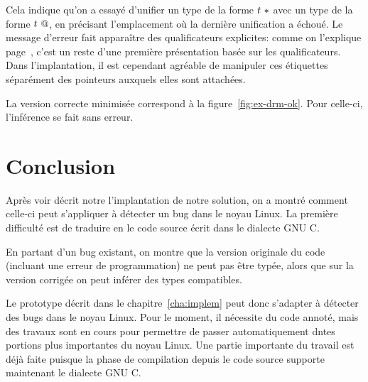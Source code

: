 Cela indique qu'on a essayé d'unifier un type de la forme $t~*$ avec un
type de la forme $t~@$, en précisant l'emplacement où la dernière
unification a échoué. Le message d'erreur fait apparaître des qualificateurs
explicites: comme on l'explique page~\pageref{page:qualifs-pas-qualifs}, c'est
un reste d'une première présentation basée sur les qualificateurs.
Dans l'implantation, il est cependant agréable de manipuler ces étiquettes
séparément des pointeurs auxquels elles sont attachées.

La version correcte minimisée correspond à la figure~\ref{fig:ex-drm-ok}. Pour
celle-ci, l'inférence se fait sans erreur.


\section*{Conclusion}

Après voir décrit notre l'implantation de notre solution, on a montré comment
celle-ci peut s'appliquer à détecter un bug dans le noyau Linux. La première
difficulté est de traduire en \newspeak le code source écrit dans le dialecte
GNU C.

En partant d'un bug existant, on montre que la version originale du code
(incluant une erreur de programmation) ne peut pas être typée, alors que sur la
version corrigée on peut inférer des types compatibles.

Le prototype décrit dans le chapitre~\ref{cha:implem} peut donc s'adapter à
détecter des bugs dans le noyau Linux. Pour le moment, il nécessite du code
annoté, mais des travaux sont en cours pour permettre de passer automatiquement
dntes portions plus importantes du noyau Linux. Une partie importante du travail
est déjà faite puisque la phase de compilation depuis le code source supporte
maintenant le dialecte GNU C.

